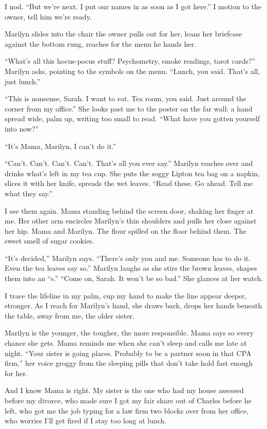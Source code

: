 \documentclass[twoside,10pt]{book}
\begin{document}
I nod. ``But we're next. I put our names in as soon as I got here.'' I
motion to the owner, tell him we're ready.

Marilyn slides into the chair the owner pulls out for her, leans her
briefcase against the bottom rung, reaches for the menu he hands her.

``What's all this hocus-pocus stuff? Psychometry, smoke readings, tarot
cards?'' Marilyn asks, pointing to the symbols on the menu. ``Lunch, you
said. That's all, just lunch.''

``This is nonsense, Sarah. I want to eat. Tea room, you said. Just
around the corner from my office.'' She looks past me to the poster on
the far wall: a hand spread wide, palm up, writing too small to read.
``What have you gotten yourself into now?''

``It's Mama, Marilyn, I can't do it.''

``Can't. Can't. Can't. Can't. That's all you ever say.'' Marilyn reaches
over and drinks what's left in my tea cup. She puts the soggy Lipton tea
bag on a napkin, slices it with her knife, spreads the wet leaves.
``Read these. Go ahead. Tell me what they say.''

I see them again. Mama standing behind the screen door, shaking her
finger at me. Her other arm encircles Marilyn's thin shoulders and pulls
her close against her hip. Mama and Marilyn. The flour spilled on the
floor behind them. The sweet smell of sugar cookies.

``It's decided,'' Marilyn says. ``There's only you and me. Someone has
to do it. Even the tea leaves say so.'' Marilyn laughs as she stirs the
brown leaves, shapes them into an ``s.'' ``Come on, Sarah. It won't be
so bad.'' She glances at her watch.

I trace the lifeline in my palm, cup my hand to make the line appear
deeper, stronger. As I reach for Marilyn's hand, she draws back, drops
her hands beneath the table, away from me, the older sister.

Marilyn is the younger, the tougher, the more responsible. Mama says so
every chance she gets. Mama reminds me when she can't sleep and calls me
late at night. ``Your sister is going places. Probably to be a partner
soon in that CPA firm,'' her voice groggy from the sleeping pills that
don't take hold fast enough for her.

And I know Mama is right. My sister is the one who had my house assessed
before my divorce, who made sure I got my fair share out of Charles
before he left, who got me the job typing for a law firm two blocks over
from her office, who worries I'll get fired if I stay too long at lunch.
\end{document}
